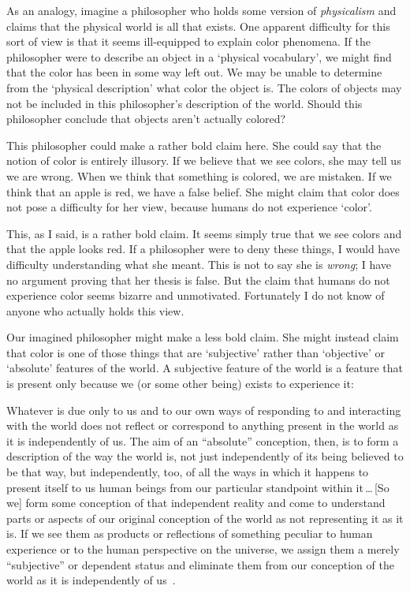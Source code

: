 \documentclass[11pt]{standalone}
\newenvironment{squote}{%
	\begin{spacing}{1}
	\begin{list}{}{%
	\setlength{\labelwidth}{0pt}%
	\rightmargin\leftmargin%
	}
	\item\relax
	}{%
	\end{list}%
	\end{spacing}
	}
\begin{document}
\begin{spacing}{1.5}
As an analogy, imagine a philosopher who holds some version of {\em
  physicalism} and claims that the physical world is all that exists.
One apparent difficulty for this sort of view is that it seems
ill-equipped to explain color phenomena.  If the philosopher were to
describe an object in a `physical vocabulary', we might find that the
color has been in some way left out.  We may be unable to determine
from the `physical description' what color the object is.  The colors
of objects may not be included in this philosopher's description of
the world.  Should this philosopher conclude that objects aren't
actually colored?

This philosopher could make a rather bold claim here.  She could say
that the notion of color is entirely illusory.  If we believe that we
see colors, she may tell us we are wrong.  When we think that
something is colored, we are mistaken.  If we think that an apple is
red, we have a false belief.  She might claim that color does not pose
a difficulty for her view, because humans do not experience `color'.

This, as I said, is a rather bold claim.  It seems simply true that we
see colors and that the apple looks red.  If a philosopher were to
deny these things, I would have difficulty understanding what she
meant.  This is not to say she is {\em wrong}; I have no argument
proving that her thesis is false.  But the claim that humans do not
experience color seems bizarre and unmotivated.  Fortunately I do not
know of anyone who actually holds this view.

Our imagined philosopher might make a less bold claim.  She might
instead claim that color is one of those things that are `subjective'
rather than `objective' or `absolute' features of the world.  A
subjective feature of the world is a feature that is present only
because we (or some other being) exists to experience it:

\begin{squote}
Whatever is due only to us and to our own ways of responding to and
interacting with the world does not reflect or correspond to anything
present in the world as it is independently of us.  The aim of an
``absolute'' conception, then, is to form a description of the way the
world is, not just independently of its being believed to be that way,
but independently, too, of all the ways in which it happens to present
itself to us human beings from our particular standpoint within
it\,\ldots\,[So we] form some conception of that independent reality
and come to understand parts or aspects of our original conception of
the world as not representing it as it is.  If we see them as products
or reflections of something peculiar to human experience or to the
human perspective on the universe, we assign them a merely
``subjective'' or dependent status and eliminate them from our
conception of the world as it is independently of
us~\citep[30--31]{stroud2000a}.
\end{squote}


\end{spacing}
\end{document}
